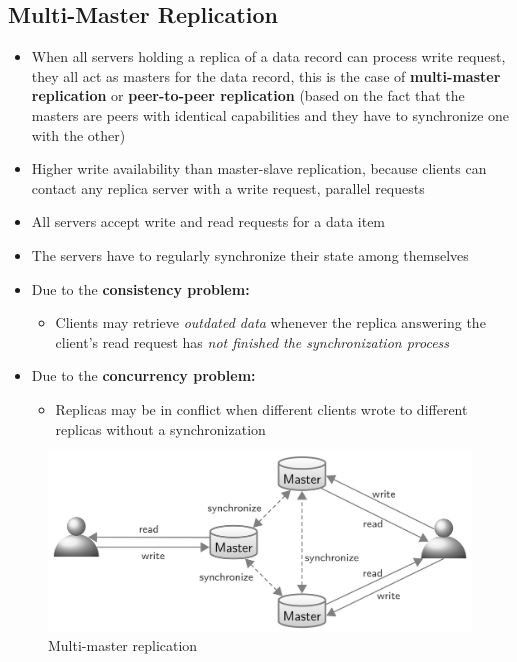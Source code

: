 \subsection{Multi-Master Replication}
\begin{itemize}
    \item When all servers holding a replica of a data record can process write request, they all act as masters for the data record, this is the case of \textbf{multi-master replication} or \textbf{peer-to-peer replication} (based on the fact that the masters are peers with identical capabilities and they have to synchronize one with the other)
    \item Higher write availability than master-slave replication, because clients can contact any replica server with a write request, parallel requests
    \item All servers accept write and read requests for a data item
    \item The servers have to regularly synchronize their state among themselves
    \item Due to the \textbf{consistency problem:}
    \begin{itemize}
        \item Clients may retrieve \textit{outdated data} whenever the replica answering the client’s read request has \textit{not finished the synchronization process}
    \end{itemize}
    \item Due to the \textbf{concurrency problem:}
    \begin{itemize}
        \item Replicas may be in conflict when different clients wrote to different replicas without a synchronization
    \end{itemize}
\end{itemize}
\begin{figure}[!h]
        \centering
        \includegraphics[width=0.8\linewidth]{images/AdvancedDataManagment/replication_and_synchronization/multi_master_replication.jpeg}
        \caption{Multi-master replication}
    \end{figure}